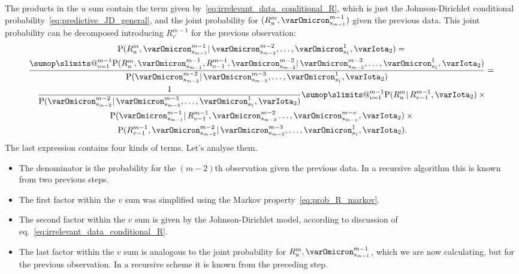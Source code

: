 \documentclass[\ifafour a4paper,12pt,\else a5paper,10pt,\fi%
onecolumn,oneside,article,%
british%
]{memoir}
\makeatletter
\theoremstyle{remark}
\theoremstyle{innote}
\def\sum{\DOTSI\sumop\slimits@}
\newcommand*{\p}{\mathrm{P}}%
\renewcommand*{\|}{\mathpunct{|}}
\newcommand*{\eqn}{eq.}%
\newcommand*{\yI}{\varIota}
\newcommand*{\yO}{\varOmicron}
\newcommand*{\yMc}{\yI_2}
\makeatother
\begin{document}
The products in the $u$ sum contain the term given
by~\eqref{eq:irrelevant_data_conditional_R}, which is just the
Johnson-Dirichlet conditional probability~\eqref{eq:predictive_JD_general},
and the joint probability for $(R^{m}_{u}, \yO^{m-1}_{s_{m-1}})$ given the
previous data. This joint probability can be decomposed introducing
$R^{m-1}_{v}$ for the previous observation:
\begin{multline}
  \label{eq:prob_R_and_last_decompose}
  \p(R^{m}_{u}, \yO^{m-1}_{s_{m-1}} \| \yO^{m-2}_{s_{m-2}}, \dotsc, \yO^{1}_{s_{1}}, \yMc) 
 ={} \\
  \frac{\sum_{v=1}^{m-1}
    \p(R^{m}_{u}, \yO^{m-1}_{s_{m-1}}, R^{m-1}_{v-1}, \yO^{m-2}_{s_{m-2}}
    \| \yO^{m-3}_{s_{m-3}}, \dotsc, \yO^{1}_{s_{1}}, \yMc)}{
\p(\yO^{m-2}_{s_{m-2}} \| \yO^{m-3}_{s_{m-3}}, \dotsc, \yO^{1}_{s_{1}}, \yMc)}
  ={}\\
    \frac{1}{\p(\yO^{m-2}_{s_{m-2}} \| \yO^{m-3}_{s_{m-3}}, \dotsc, \yO^{1}_{s_{1}}, \yMc)}
  \sum_{v=1}^{m-1} \p(R^{m}_{u} \| R^{m-1}_{v-1}, \yMc)
  \times{}\\
  \p(\yO^{m-1}_{s_{m-1}} \|
    R^{m-1}_{v-1}, \yO^{m-2}_{s_{m-2}} \dotsc, \yO^{m-v}_{s_{m-v}}, \yMc)
    \times{}\\
 \p(R^{m-1}_{v-1}, \yO^{m-2}_{s_{m-2}} \|
  \yO^{m-3}_{s_{m-3}},\dotsc, \yO^{1}_{s_{1}}, \yMc).
\end{multline}
The last expression contains four kinds of terms. Let's analyse them.

\begin{itemize}
\item The denominator is the probability for the $(m-2)$th observation
  given the previous data. In a recursive algorithm this is known from two
  previous steps.

\item The first factor within the $v$ sum was simplified using the Markov
  property~\eqref{eq:prob_R_markov}.

\item The second factor within the $v$ sum is given by the
  Johnson-Dirichlet model, according to discussion of
  \eqn~\eqref{eq:irrelevant_data_conditional_R}.

\item The last factor within the $v$ sum is analogous to the joint
  probability for $R^{m}_{u}, \yO^{m-1}_{s_{m-1}}$, which we are now
  calculating, but for the previous observation. In a recursive scheme it
  is known from the preceding step.
\end{itemize}
\end{document}
